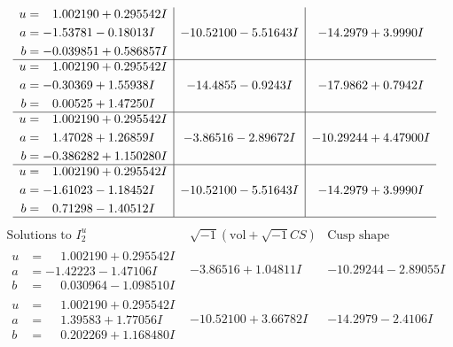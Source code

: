 \documentclass[1p]{elsarticle_modified}
\theoremstyle{definition}
\newcommand{\I}{\sqrt{-1}}
\begin{document}
$$\begin{array}{c|c|c}
\begin{aligned}
u &= \phantom{-}1.002190 + 0.295542 I \\
a &= -1.53781 - 0.18013 I \\
b &= -0.039851 + 0.586857 I\end{aligned}
 & -10.52100 - 5.51643 I & -14.2979 + 3.9990 I \\ \hline\begin{aligned}
u &= \phantom{-}1.002190 + 0.295542 I \\
a &= -0.30369 + 1.55938 I \\
b &= \phantom{-}0.00525 + 1.47250 I\end{aligned}
 & -14.4855 - 0.9243 I & -17.9862 + 0.7942 I \\ \hline\begin{aligned}
u &= \phantom{-}1.002190 + 0.295542 I \\
a &= \phantom{-}1.47028 + 1.26859 I \\
b &= -0.386282 + 1.150280 I\end{aligned}
 & -3.86516 - 2.89672 I & -10.29244 + 4.47900 I \\ \hline\begin{aligned}
u &= \phantom{-}1.002190 + 0.295542 I \\
a &= -1.61023 - 1.18452 I \\
b &= \phantom{-}0.71298 - 1.40512 I\end{aligned}
 & -10.52100 - 5.51643 I & -14.2979 + 3.9990 I\\
 \hline 
 \end{array}$$\newpage$$\begin{array}{c|c|c}  
\text{Solutions to }I^u_{2}& \I (\text{vol} + \sqrt{-1}CS) & \text{Cusp shape}\\
 \hline 
\begin{aligned}
u &= \phantom{-}1.002190 + 0.295542 I \\
a &= -1.42223 - 1.47106 I \\
b &= \phantom{-}0.030964 - 1.098510 I\end{aligned}
 & -3.86516 + 1.04811 I & -10.29244 - 2.89055 I \\ \hline\begin{aligned}
u &= \phantom{-}1.002190 + 0.295542 I \\
a &= \phantom{-}1.39583 + 1.77056 I \\
b &= \phantom{-}0.202269 + 1.168480 I\end{aligned}
 & -10.52100 + 3.66782 I & -14.2979 - 2.4106 I \\ \hline\begin{aligned}

\end{aligned}
\end{array}$$
\end{document}
